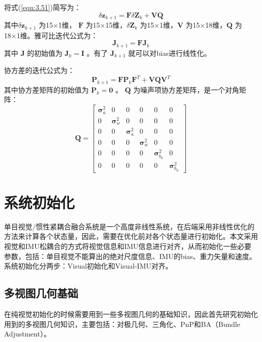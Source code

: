 将式(\ref{eqn:3.51})简写为：
\begin{equation}
\label{eqn:3.54}
\delta \mathbf{z}_{k+1} =\mathbf{F} \delta \mathbf{Z}_{k} + \mathbf{V} \mathbf{Q}
\end{equation}
其中$\delta \mathbf{z}_{k+1}$ 为15×1维， $\mathbf{F}$ 为15×15维，$\delta \mathbf{Z}_{k} $ 为15×1维，$\mathbf{V} $ 为15×18维，$\mathbf{Q} $ 为18×1维。雅可比迭代公式为：
\begin{equation}
\label{eqn:3.55}
\mathbf{J}_{k+1} = \mathbf{F} \mathbf{J}_{k}
\end{equation}
其中 $\mathbf{J} $ 的初始值为 $\mathbf{J}_k =\mathbf{I} $ 。有了 $\mathbf{J}_{k+1} $ 就可以对bias进行线性化。

协方差的迭代公式为：
\begin{equation}
\label{eqn:3.56}
\mathbf{ P}_{k+1} 
=\mathbf{F} \mathbf{P}_{k} \mathbf{F}^{T}+\mathbf{V} \mathbf{Q} \mathbf{V}^{T}
\end{equation}
其中协方差矩阵的初始值为 $\mathbf{P}_k=\mathbf{0} $ 。 $\mathbf{Q} $ 为噪声项协方差矩阵，是一个对角矩阵：
\begin{equation}
\label{eqn:3.57}
\mathbf{Q}=\left[ \begin{array}{cccccc}
{\bm{\sigma}_{a}^{2}} & {0} & {0} & {0} & {0} & {0} \\ 
{0} & {\bm{\sigma}_{w}^{2}} & {0} & {0} & {0} & {0} \\ 
{0} & {0} & {\bm{\sigma}_{a}^{2}} & {0} & {0} & {0} \\ 
{0} & {0} & {0} & {\bm{\sigma}_{w}^{2}} & {0} & {0} \\ 
{0} & {0} & {0} & {0} & {\bm{\sigma}_{b_{a}}^{2}} & {0} \\ 
{0} & {0} & {0} & {0} & {0} & {\bm{\sigma}_{b_{w}}^{2}}
\end{array}\right]
\end{equation}
\section{系统初始化}
单目视觉/惯性紧耦合融合系统是一个高度非线性系统，在后端采用非线性优化的方法来计算各个状态量，因此，需要在优化前对各个状态量进行初始化。本文采用视觉和IMU松耦合的方式将视觉信息和IMU信息进行对齐，从而初始化一些必要参数，包括：单目视觉不能算出的绝对尺度信息、IMU的bias、重力矢量和速度。系统初始化分两步：Visual初始化和Visual-IMU对齐。
\subsection{多视图几何基础}
在纯视觉初始化的时候需要用到一些多视图几何的基础知识，因此首先研究初始化用到的多视图几何知识，主要包括：对极几何、三角化、PnP和BA（Bundle Adjustment）。

